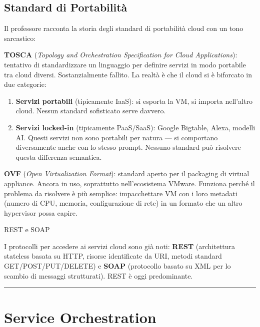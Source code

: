 \documentclass[
  italian,
  openany]{book}
\providecommand{\tightlist}{%
  \setlength{\itemsep}{0pt}\setlength{\parskip}{0pt}}
\begin{document}
\subsection{Standard di Portabilità}\label{standard-di-portabilituxe0}

Il professore racconta la storia degli standard di portabilità cloud con
un tono sarcastico:

\textbf{TOSCA} (\emph{Topology and Orchestration Specification for Cloud
Applications}): tentativo di standardizzare un linguaggio per definire
servizi in modo portabile tra cloud diversi. Sostanzialmente fallito. La
realtà è che il cloud si è biforcato in due categorie:

\begin{enumerate}
\def\labelenumi{\arabic{enumi}.}
\tightlist
\item
  \textbf{Servizi portabili} (tipicamente IaaS): si esporta la VM, si
  importa nell'altro cloud. Nessun standard sofisticato serve davvero.
\item
  \textbf{Servizi locked-in} (tipicamente PaaS/SaaS): Google Bigtable,
  Alexa, modelli AI. Questi servizi non sono portabili per natura --- si
  comportano diversamente anche con lo stesso prompt. Nessuno standard
  può risolvere questa differenza semantica.
\end{enumerate}

\textbf{OVF} (\emph{Open Virtualization Format}): standard aperto per il
packaging di virtual appliance. Ancora in uso, soprattutto
nell'ecosistema VMware. Funziona perché il problema da risolvere è più
semplice: impacchettare VM con i loro metadati (numero di CPU, memoria,
configurazione di rete) in un formato che un altro hypervisor possa
capire.

\begin{calloutnote}{REST e SOAP}

I protocolli per accedere ai servizi cloud sono già noti: \textbf{REST}
(architettura stateless basata su HTTP, risorse identificate da URI,
metodi standard GET/POST/PUT/DELETE) e \textbf{SOAP} (protocollo basato
su XML per lo scambio di messaggi strutturati). REST è oggi
predominante.

\end{calloutnote}

\begin{center}\rule{0.5\linewidth}{0.5pt}\end{center}

\section{Service Orchestration}\label{service-orchestration}
\end{document}

